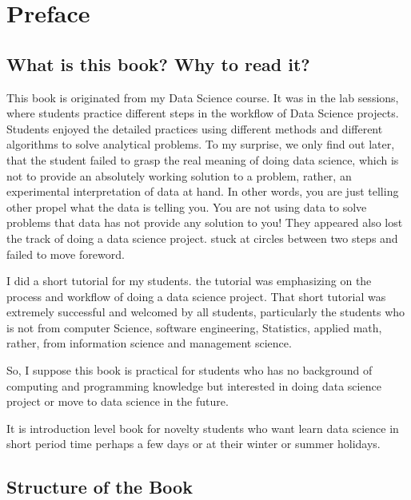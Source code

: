\documentclass[
]{book}
\begin{document}
\hypertarget{preface}{%
\chapter*{Preface}\label{preface}}


\hypertarget{what-is-this-book-why-to-read-it}{%
\section{What is this book? Why to read it?}\label{what-is-this-book-why-to-read-it}}

This book is originated from my Data Science course. It was in the lab sessions, where students practice different steps in the workflow of Data Science projects. Students enjoyed the detailed practices using different methods and different algorithms to solve analytical problems. To my surprise, we only find out later, that the student failed to grasp the real meaning of doing data science, which is not to provide an absolutely working solution to a problem, rather, an experimental interpretation of data at hand. In other words, you are just telling other propel what the data is telling you. You are not using data to solve problems that data has not provide any solution to you! They appeared also lost the track of doing a data science project. stuck at circles between two steps and failed to move foreword.

I did a short tutorial for my students. the tutorial was emphasizing on the process and workflow of doing a data science project. That short tutorial was extremely successful and welcomed by all students, particularly the students who is not from computer Science, software engineering, Statistics, applied math, rather, from information science and management science.

So, I suppose this book is practical for students who has no background of computing and programming knowledge but interested in doing data science project or move to data science in the future.

It is introduction level book for novelty students who want learn data science in short period time perhaps a few days or at their winter or summer holidays.

\hypertarget{structure-of-the-book}{%
\section{Structure of the Book}\label{structure-of-the-book}}
\end{document}
